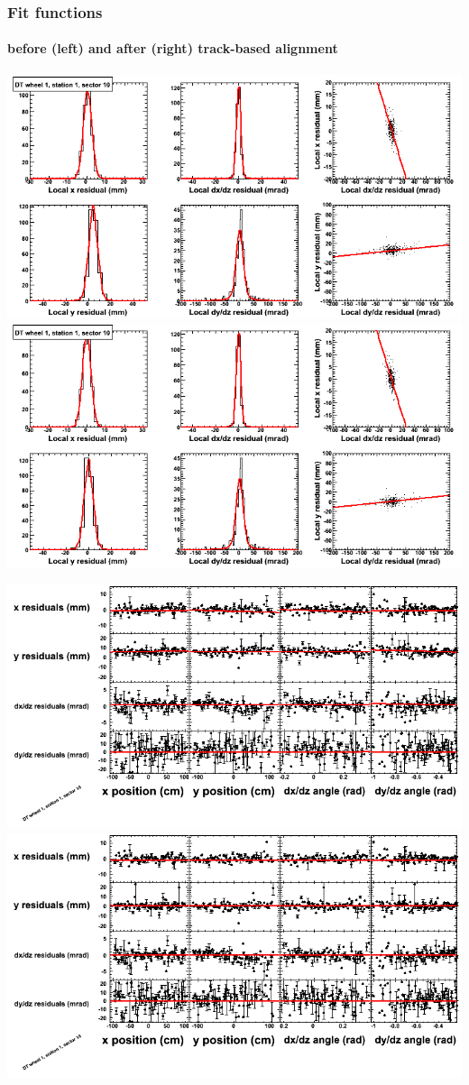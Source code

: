 \documentclass[compress]{beamer}
\begin{document}
\begin{frame}
\frametitle{Fit functions}
\framesubtitle{before (left) and after (right) track-based alignment}
\includegraphics[width=0.5\linewidth]{fitfunctions_re01/MBwhDst1sec10_bellcurves.png} \includegraphics[width=0.5\linewidth]{fitfunctions_re05/MBwhDst1sec10_bellcurves.png}

\includegraphics[width=0.5\linewidth]{fitfunctions_re01/MBwhDst1sec10_polynomials.png} \includegraphics[width=0.5\linewidth]{fitfunctions_re05/MBwhDst1sec10_polynomials.png}
\end{frame}
\end{document}
